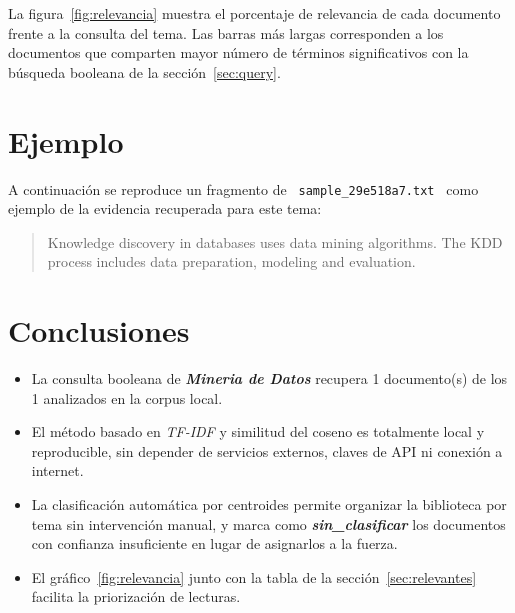 \documentclass[11pt,a4paper]{article}
\newcommand{\tema}[1]{\textbf{\textit{#1}}}
\newcommand{\nombrearchivo}[1]{\texttt{#1}}
\begin{document}
La figura~\ref{fig:relevancia} muestra el porcentaje de relevancia de cada
documento frente a la consulta del tema. Las barras más largas corresponden a
los documentos que comparten mayor número de términos significativos con la
búsqueda booleana de la sección~\ref{sec:query}.


\section{Ejemplo}
\label{sec:ejemplo}

A continuación se reproduce un fragmento de
\nombrearchivo{ sample\_29e518a7.txt } como ejemplo de la evidencia
recuperada para este tema:

\begin{quote}
\small
Knowledge discovery in databases uses data mining algorithms. The KDD process includes data preparation, modeling and evaluation.
\end{quote}


\section{Conclusiones}
\label{sec:conclusiones}

\begin{itemize}
\setlength{\itemsep}{4pt}
  \item La consulta booleana de \tema{ Mineria de Datos } recupera
        1 documento(s) de los 1
        analizados en la corpus local.
  \item El método basado en \textit{TF-IDF} y similitud del coseno es
        totalmente local y reproducible, sin depender de servicios externos,
        claves de API ni conexión a internet.
  \item La clasificación automática por centroides permite organizar la
        biblioteca por tema sin intervención manual, y marca como
        \tema{sin\_clasificar} los documentos con confianza insuficiente en
        lugar de asignarlos a la fuerza.
  \item El gráfico~\ref{fig:relevancia} junto con la tabla de la
        sección~\ref{sec:relevantes} facilita la priorización de lecturas.
\end{itemize}
\end{document}

